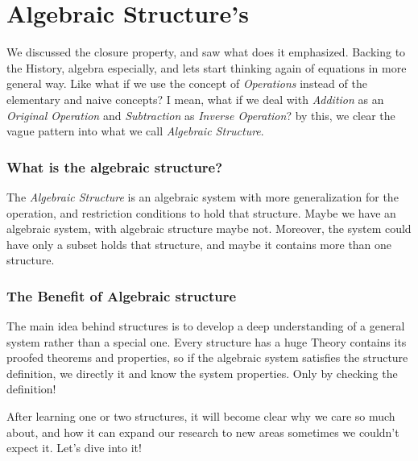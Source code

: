 \section{Algebraic Structure's}
We discussed the closure property, and saw what does it emphasized. Backing to the History, algebra especially, and lets start thinking again of equations in more general way. Like what if we use the concept of {\it Operations} instead of the elementary and naive concepts? I mean, what if we deal with {\it Addition} as an {\it Original Operation} and {\it Subtraction} as {\it Inverse Operation}? by this, we clear the vague pattern into what we call {\it Algebraic Structure}.

\subsubsection{What is the algebraic structure?}
The {\it Algebraic Structure} is an algebraic system with more generalization for the operation, and restriction conditions to hold that structure. Maybe we have an algebraic system, with algebraic structure maybe not. Moreover, the system could have only a subset holds that structure, and maybe it contains more than one structure.

\subsubsection{The Benefit of Algebraic structure}
The main idea behind structures is to develop a deep understanding of a general system rather than a special one. Every structure has a huge Theory contains its proofed theorems and properties, so if the algebraic system satisfies the structure definition, we directly it and know the system properties. Only by checking the definition!

After learning one or two structures, it will become clear why we care so much about, and how it can expand our research to new areas sometimes we couldn't expect it. Let's dive into it!